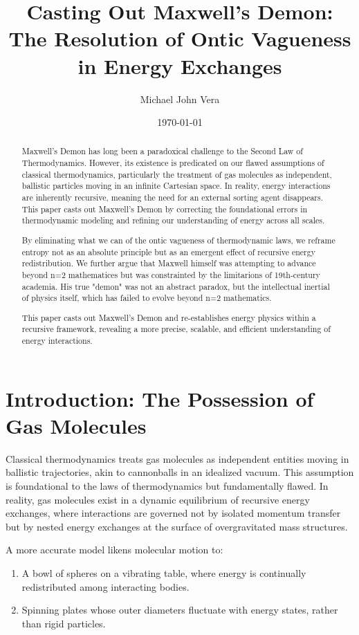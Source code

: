 \documentclass[12pt]{article}
\title{Casting Out Maxwell's Demon: The Resolution of Ontic Vagueness in Energy Exchanges}
\author{Michael John Vera}
\date{\today}
\begin{document}
\maketitle

\begin{abstract}
Maxwell’s Demon has long been a paradoxical challenge to the Second Law of Thermodynamics. However, its existence is predicated on our flawed assumptions of classical thermodynamics, particularly the treatment of gas molecules as independent, ballistic particles moving in an infinite Cartesian space. In reality, energy interactions are inherently recursive, meaning the need for an external sorting agent disappears. This paper casts out Maxwell’s Demon by correcting the foundational errors in thermodynamic modeling and refining our understanding of energy across all scales.

By eliminating what we can of the ontic vagueness of thermodynamic laws, we reframe entropy not as an absolute principle but as an emergent effect of recursive energy redistribution. We further argue that Maxwell himself was attempting to advance beyond n=2 mathematices but was constrainted by the limitarions of 19th-century academia. His true "demon" was not an abstract paradox, but the intellectual inertial of physics itself, which has failed to evolve beyond n=2 mathematics.

This paper casts out Maxwell’s Demon and re-establishes energy physics within a recursive framework, revealing a more precise, scalable, and efficient understanding of energy interactions.

\end{abstract}

\section{Introduction: The Possession of Gas Molecules}
Classical thermodynamics treats gas molecules as independent entities moving in ballistic trajectories, akin to cannonballs in an idealized vacuum. This assumption is foundational to the laws of thermodynamics but fundamentally flawed. In reality, gas molecules exist in a dynamic equilibrium of recursive energy exchanges, where interactions are governed not by isolated momentum transfer but by nested energy exchanges at the surface of overgravitated mass structures.

A more accurate model likens molecular motion to:
\begin{enumerate}
    \item A bowl of spheres on a vibrating table, where energy is continually redistributed among interacting bodies.
    \item Spinning plates whose outer diameters fluctuate with energy states, rather than rigid particles.
\end{enumerate}
\end{document}

